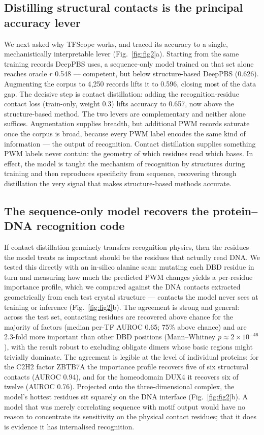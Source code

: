 \documentclass[11pt,letterpaper]{article}
\begin{document}
\subsection*{Distilling structural contacts is the principal accuracy lever}
We next asked why TFScope works, and traced its accuracy to a single, mechanistically interpretable
lever (Fig.~\ref{fig:fig2}a). Starting from the same training records DeepPBS uses, a sequence-only
model trained on that set alone reaches oracle $r$ 0.548 --- competent, but below structure-based
DeepPBS (0.626). Augmenting the corpus to 4{,}250 records lifts it to 0.596, closing most of the
data gap. The decisive step is contact distillation: adding the recognition-residue contact loss
(train-only, weight 0.3) lifts accuracy to 0.657, now above the structure-based method. The two
levers are complementary and neither alone suffices. Augmentation supplies breadth, but additional
PWM records saturate once the corpus is broad, because every PWM label encodes the same kind of
information --- the output of recognition. Contact distillation supplies something PWM labels never
contain: the geometry of which residues read which bases. In effect, the model is taught the
mechanism of recognition by structures during training and then reproduces specificity from
sequence, recovering through distillation the very signal that makes structure-based methods
accurate.

\subsection*{The sequence-only model recovers the protein--DNA recognition code}
If contact distillation genuinely transfers recognition physics, then the residues the model
treats as important should be the residues that actually read DNA. We tested this directly with an
in-silico alanine scan: mutating each DBD residue in turn and measuring how much the predicted PWM
changes yields a per-residue importance profile, which we compared against the DNA contacts
extracted geometrically from each test crystal structure --- contacts the model never sees at
training or inference (Fig.~\ref{fig:fig2}b). The agreement is strong and general: across the test
set, contacting residues are recovered above chance for the majority of factors (median per-TF
AUROC 0.65; 75\% above chance) and are 2.3-fold more important than other DBD positions
(Mann--Whitney $p\approx2\times10^{-46}$), with the result robust to excluding obligate dimers
whose basic regions might trivially dominate. The agreement is legible at the level of individual
proteins: for the C2H2 factor ZBTB7A the importance profile recovers five of six structural
contacts (AUROC 0.94), and for the homeodomain DUX4 it recovers six of twelve (AUROC 0.76).
Projected onto the three-dimensional complex, the model's hottest residues sit squarely on the
DNA interface (Fig.~\ref{fig:fig2}b). A model that was merely correlating sequence with motif
output would have no reason to concentrate its sensitivity on the physical contact residues; that
it does is evidence it has internalised recognition.
\end{document}
